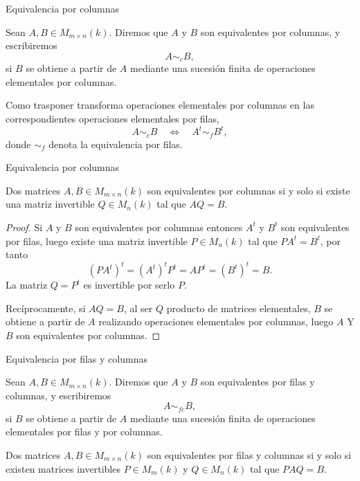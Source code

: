 \begin{frame}{Equivalencia por columnas}

\begin{definition}
Sean \(A,B\in M_{m\times n}(k)\). Diremos que \(A\) y \(B\) son
\alert{equivalentes por columnas}, y escribiremos
\[
A\sim_c B,
\]
si \(B\) se obtiene a partir de \(A\) mediante una sucesión finita
de operaciones elementales por columnas.
\end{definition}

\medskip

Como trasponer transforma operaciones elementales por columnas en
las correspondientes operaciones elementales por filas,
\[
A\sim_c B
\quad\Longleftrightarrow\quad
A^t\sim_f B^t,
\]
donde \(\sim_f\) denota la equivalencia por filas.

\end{frame}


\begin{frame}{Equivalencia por columnas}

\begin{proposition}
Dos matrices $A,B\in M_{m\times n}(k)$ son equivalentes por columnas si y solo si existe una matriz invertible $Q\in M_n(k)$ tal que $AQ=B$.\end{proposition}

\begin{proof}
	Si $A$ y $B$ son equivalentes por columnas entonces $A^t$ y $B^t$ son equivalentes por filas, luego existe una matriz invertible $P\in M_n(k)$ tal que $PA^t=B^t$, por tanto
	\[(PA^t)^t=(A^t)^tP^t=AP^t=(B^t)^t=B.\]
	La matriz $Q=P^t$ es invertible por serlo $P$.
	
	\medskip
	
	Recíprocamente, si $AQ=B$, al ser $Q$ producto de matrices elementales, $B$ se obtiene a partir de $A$ realizando operaciones elementales por columnas, luego $A$ Y $B$ son equivalentes por columnas.
\end{proof}

\end{frame}

\begin{frame}{Equivalencia por filas y columnas}

\begin{definition}
Sean \(A,B\in M_{m\times n}(k)\). Diremos que \(A\) y \(B\) son
\alert{equivalentes por filas y columnas}, y escribiremos
\[
A\sim_{fc}B,
\]
si \(B\) se obtiene a partir de \(A\) mediante una sucesión finita
de operaciones elementales por filas y por columnas.
\end{definition}

\begin{proposition}
	Dos matrices $A,B\in M_{m\times n}(k)$ son equivalentes por filas y columnas si y solo si existen matrices invertibles $P\in M_m(k)$ y $Q\in M_n(k)$ tal que $PAQ=B$.
\end{proposition}


\end{frame}

